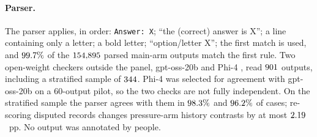 \paragraph{Parser.} The parser applies, in order: \texttt{Answer:\ X}; ``the
(correct) answer is X''; a line containing only a letter; a bold letter;
``option/letter X''; the first match is used, and $99.7\%$ of the
$154{,}895$ parsed main-arm outputs match the first rule. Two open-weight checkers outside the panel,
\mbox{gpt-oss-20b} \citep{openai-2025-gptoss} and \mbox{Phi-4}
\citep{abdin-etal-2024-phi4}, read $901$ outputs, including a stratified
sample of $344$. \mbox{Phi-4} was selected for agreement with
\mbox{gpt-oss-20b} on a 60-output pilot, so the two checks are not fully
independent. On the stratified sample the parser agrees with them in
$98.3\%$ and $96.2\%$ of cases; re-scoring disputed
records changes pressure-arm history contrasts by at most
$2.19$~pp. No
output was annotated by people.

